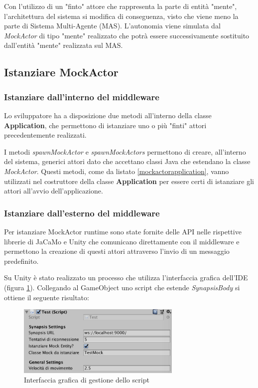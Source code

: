 Con l'utilizzo di un "finto" attore che rappresenta la parte di entità "mente", l'architettura del sistema si modifica di conseguenza, visto che viene meno la parte di Sistema Multi-Agente (MAS). L'autonomia viene simulata dal \textit{MockActor} di tipo "mente" realizzato che potrà essere successivamente sostituito dall'entità "mente" realizzata sul MAS.

\subsection{Istanziare MockActor}

\subsubsection{Istanziare dall'interno del middleware}

Lo sviluppatore ha a disposizione due metodi all'interno della classe \textbf{Application}, che permettono di istanziare uno o più "finti" attori precedentemente realizzati.



I metodi \textit{spawnMockActor} e \textit{spawnMockActors} permettono di creare, all'interno del sistema, generici attori dato che accettano classi Java che estendano la classe \textit{MockActor}. Questi metodi, come da listato \ref{mockactorapplication}, vanno utilizzati nel costruttore della classe \textbf{Application} per essere certi di istanziare gli attori all'avvio dell'applicazione.

\subsubsection{Istanziare dall'esterno del middleware}

Per istanziare MockActor runtime sono state fornite delle API nelle rispettive librerie di JaCaMo e Unity che comunicano direttamente con il middleware e permettono la creazione di questi attori attraverso l'invio di un messaggio predefinito.

\medskip

Su Unity è stato realizzato un processo che utilizza l'interfaccia grafica dell'IDE (figura \ref{gui_script}). Collegando al GameObject uno script che estende \textit{SynapsisBody} si ottiene il seguente risultato:

\begin{figure}[H]
\centering
\includegraphics[width=0.7\textwidth]{figures/Unity_Test_editor.png}
\caption{Interfaccia grafica di gestione dello script}
\label{gui_script}
\end{figure}

